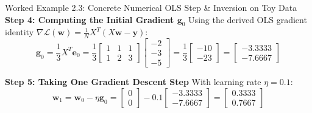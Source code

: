 \begin{examplebox}[breakable]{Worked Example 2.3: Concrete Numerical OLS Step \& Inversion on Toy Data}
\textbf{Step 4: Computing the Initial Gradient $\mathbf{g}_0$}
Using the derived OLS gradient identity $\nabla \mathcal{L}(\mathbf{w}) = \frac{1}{N} X^T (X\mathbf{w} - \mathbf{y})$:
\begin{equation*}
\mathbf{g}_0 = \frac{1}{3} X^T \mathbf{e}_0 = \frac{1}{3} \begin{bmatrix} 1 & 1 & 1 \\ 1 & 2 & 3 \end{bmatrix} \begin{bmatrix} -2 \\ -3 \\ -5 \end{bmatrix} = \frac{1}{3} \begin{bmatrix} -10 \\ -23 \end{bmatrix} = \mathbf{\begin{bmatrix} -3.3333 \\ -7.6667 \end{bmatrix}}
\end{equation*}

\textbf{Step 5: Taking One Gradient Descent Step}
With learning rate $\eta = 0.1$:
\begin{equation*}
\mathbf{w}_1 = \mathbf{w}_0 - \eta \mathbf{g}_0 = \begin{bmatrix} 0 \\ 0 \end{bmatrix} - 0.1 \begin{bmatrix} -3.3333 \\ -7.6667 \end{bmatrix} = \mathbf{\begin{bmatrix} 0.3333 \\ 0.7667 \end{bmatrix}}
\end{equation*}


\end{examplebox}
